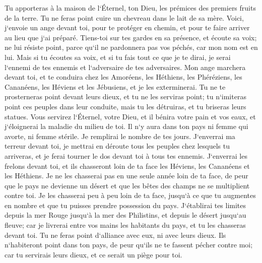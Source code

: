 \verse Tu apporteras à la maison de l`Éternel, ton Dieu, les prémices des premiers fruits de la terre. Tu ne feras point cuire un chevreau dans le lait de sa mère. 
\verse Voici, j`envoie un ange devant toi, pour te protéger en chemin, et pour te faire arriver au lieu que j`ai préparé. 
\verse Tiens-toi sur tes gardes en sa présence, et écoute sa voix; ne lui résiste point, parce qu`il ne pardonnera pas vos péchés, car mon nom est en lui. 
\verse Mais si tu écoutes sa voix, et si tu fais tout ce que je te dirai, je serai l`ennemi de tes ennemis et l`adversaire de tes adversaires. 
\verse Mon ange marchera devant toi, et te conduira chez les Amoréens, les Héthiens, les Phéréziens, les Cananéens, les Héviens et les Jébusiens, et je les exterminerai. 
\verse Tu ne te prosterneras point devant leurs dieux, et tu ne les serviras point; tu n`imiteras point ces peuples dans leur conduite, mais tu les détruiras, et tu briseras leurs statues. 
\verse Vous servirez l`Éternel, votre Dieu, et il bénira votre pain et vos eaux, et j`éloignerai la maladie du milieu de toi. 
\verse Il n`y aura dans ton pays ni femme qui avorte, ni femme stérile. Je remplirai le nombre de tes jours. 
\verse J`enverrai ma terreur devant toi, je mettrai en déroute tous les peuples chez lesquels tu arriveras, et je ferai tourner le dos devant toi à tous tes ennemis. 
\verse J`enverrai les frelons devant toi, et ils chasseront loin de ta face les Héviens, les Cananéens et les Héthiens. 
\verse Je ne les chasserai pas en une seule année loin de ta face, de peur que le pays ne devienne un désert et que les bêtes des champs ne se multiplient contre toi. 
\verse Je les chasserai peu à peu loin de ta face, jusqu`à ce que tu augmentes en nombre et que tu puisses prendre possession du pays. 
\verse J`établirai tes limites depuis la mer Rouge jusqu`à la mer des Philistins, et depuis le désert jusqu`au fleuve; car je livrerai entre vos mains les habitants du pays, et tu les chasseras devant toi. 
\verse Tu ne feras point d`alliance avec eux, ni avec leurs dieux. 
\verse Ils n`habiteront point dans ton pays, de peur qu`ils ne te fassent pécher contre moi; car tu servirais leurs dieux, et ce serait un piège pour toi. 

